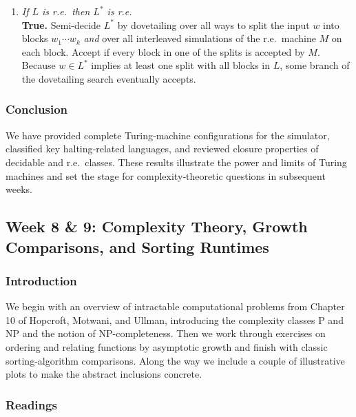 \documentclass{article}
\theoremstyle{theorem}
\theoremstyle{definition}
\theoremstyle{remark}
\begin{document}
\begin{enumerate}
  \item \emph{If $L$ is r.e.\ then $L^{\!*}$ is r.e.}\\[2pt]
        \textbf{True.}  Semi-decide $L^{\!*}$ by dovetailing over all ways to split the input $w$ into blocks
        $w_1\cdots w_k$ \emph{and} over all interleaved simulations of the r.e.\ machine $M$ on each block.
        Accept if every block in one of the splits is accepted by $M$.  
        Because $w\in L^{\!*}$ implies at least one split with all blocks in $L$, some branch of the dovetailing search eventually accepts.
\end{enumerate}


\subsubsection{Conclusion}

We have provided complete Turing‐machine configurations for the simulator, classified key halting‐related languages, and reviewed closure properties of decidable and r.e.\ classes.  These results illustrate the power and limits of Turing machines and set the stage for complexity‐theoretic questions in subsequent weeks.

\newpage

\subsection{Week 8 \& 9: Complexity Theory, Growth Comparisons, and Sorting Runtimes}

\subsubsection{Introduction}
We begin with an overview of intractable computational problems from Chapter 10 of Hopcroft, Motwani, and Ullman, introducing the complexity classes P and NP and the notion of NP-completeness. Then we work through exercises on ordering and relating functions by asymptotic growth and finish with classic sorting-algorithm comparisons. Along the way we include a couple of illustrative plots to make the abstract inclusions concrete.

\subsubsection{Readings}
\end{document}
